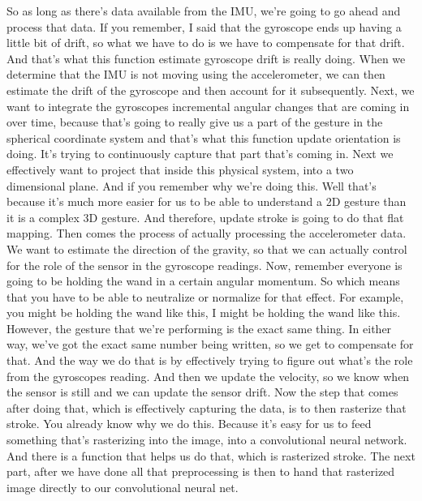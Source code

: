     So as long as there's data available from the IMU,
    we're going to go ahead and process that data.
    If you remember, I said that the gyroscope ends up
    having a little bit of drift, so what we have to do
    is we have to compensate for that drift.
    And that's what this function estimate gyroscope drift is really doing.
    When we determine that the IMU is not moving using the accelerometer,
    we can then estimate the drift of the gyroscope
    and then account for it subsequently.
    Next, we want to integrate the gyroscopes incremental angular
    changes that are coming in over time, because that's going to really give us
    a part of the gesture in the spherical coordinate system
    and that's what this function update orientation is doing.
    It's trying to continuously capture that part that's coming in.
    Next we effectively want to project that inside this physical system,
    into a two dimensional plane.
    And if you remember why we're doing this.
    Well that's because it's much more easier for us
    to be able to understand a 2D gesture than it is a complex 3D gesture.
    And therefore, update stroke is going to do that flat mapping.
    Then comes the process of actually processing the accelerometer data.
    We want to estimate the direction of the gravity,
    so that we can actually control for the role of the sensor
    in the gyroscope readings.
    Now, remember everyone is going to be holding the wand in a certain angular
    momentum.
    So which means that you have to be able to neutralize or normalize
    for that effect.
    For example, you might be holding the wand like this,
    I might be holding the wand like this.
    However, the gesture that we're performing is the exact same thing.
    In either way, we've got the exact same number being written,
    so we get to compensate for that.
    And the way we do that is by effectively trying to figure out what's
    the role from the gyroscopes reading.
    And then we update the velocity, so we know when the sensor is still
    and we can update the sensor drift.
    Now the step that comes after doing that,
    which is effectively capturing the data, is to then rasterize that stroke.
    You already know why we do this.
    Because it's easy for us to feed something
    that's rasterizing into the image, into a convolutional neural network.
    And there is a function that helps us do that, which is rasterized stroke.
    The next part, after we have done all that preprocessing
    is then to hand that rasterized image directly
    to our convolutional neural net.

